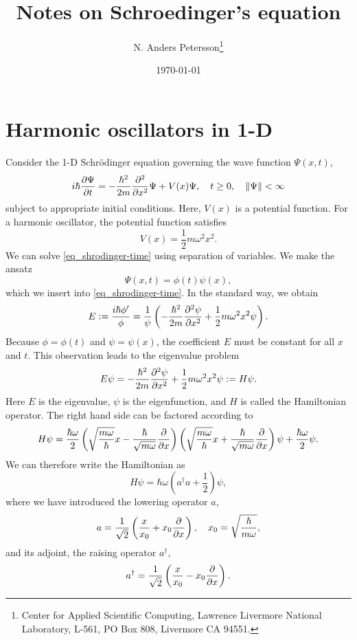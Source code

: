 \documentclass[11pt]{article}
\begin{document}
\title{Notes on Schroedinger's equation}

\author{N. Anders Petersson\thanks{Center for Applied
    Scientific Computing, Lawrence Livermore National Laboratory, L-561, PO Box 808, Livermore CA
    94551. }}

\date{\today}

\maketitle

\section{Harmonic oscillators in 1-D}
 Consider the 1-D Schr\"odinger equation governing the wave function $\Psi(x,t)$,
\begin{equation}\label{eq_shrodinger-time}
i\hbar\frac{\partial \Psi}{\partial t} = -\frac{\hbar^2}{2 m} \frac{\partial^2}{\partial x^2} \Psi + V(x) \Psi,\quad t\geq
0,\quad \| \Psi \| < \infty
\end{equation}
subject to appropriate initial conditions. Here, $V(x)$ is a potential function. For a harmonic
oscillator, the potential function satisfies
\[
V(x) = \frac{1}{2}m\omega^2 x^2.
\]
We can solve \eqref{eq_shrodinger-time} using separation of variables. We make the ansatz
\[
\Psi(x,t) = \phi(t) \psi(x),
\]
which we insert into \eqref{eq_shrodinger-time}. In the standard way, we obtain
\[
E:= \frac{i\hbar \phi'}{\phi} = \frac{1}{\psi} \left(-\frac{\hbar^2}{2m} \frac{\partial^2\psi}{\partial x^2} +
\frac{1}{2} m \omega^2 x^2 \psi \right).
\]
Because $\phi=\phi(t)$ and $\psi=\psi(x)$, the coefficient $E$ must be constant for all $x$ and
$t$. This observation leads to the eigenvalue problem
\begin{equation}\label{eq_eigen-problem}
E\psi = -\frac{\hbar^2}{2m} \frac{\partial^2\psi}{\partial x^2} + \frac{1}{2} m \omega^2 x^2 \psi := H\psi.
\end{equation}
Here $E$ is the eigenvalue, $\psi$ is the eigenfunction, and $H$ is called the Hamiltonian
operator. The right hand side can be factored according to
\[
H\psi = \frac{\hbar\omega}{2}
%
\left(\sqrt{\frac{m\omega}{\hbar}} x - \frac{\hbar}{\sqrt{m\omega}} \frac{\p}{\p x} \right)
%
\left(\sqrt{\frac{m \omega}{\hbar}} x + \frac{\hbar}{\sqrt{m\omega}} \frac{\p}{\p x} \right) \psi +
%
\frac{\hbar \omega}{2} \psi.
\]
We can therefore write the Hamiltonian as
\begin{equation}\label{eq_ladder}
H\psi = \hbar\omega\left( a^\dag a + \frac{1}{2} \right)\psi,
\end{equation}
where we have introduced the lowering operator $a$,
\begin{equation}
  a = \frac{1}{\sqrt{2}} \left(\frac{x}{x_0} + x_0 \frac{\partial}{\partial x} \right),\quad x_0 = \sqrt{\frac{\hbar}{m\omega}},
\end{equation}
and its adjoint, the raising operator $a^\dag$,
\begin{equation}
  a^\dag= \frac{1}{\sqrt{2}} \left(\frac{x}{x_0} - x_0 \frac{\partial}{\partial x} \right).
\end{equation}
\end{document}

